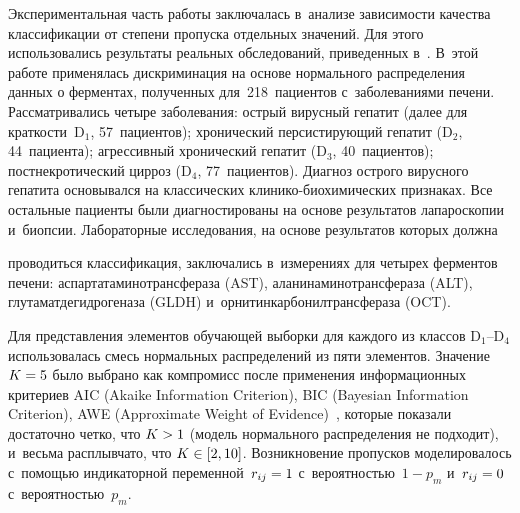 \begin{multicols}{2}
     Экспериментальная часть работы заключалась в~анализе зависимости 
качества классификации от степени пропуска отдельных значений. Для этого 
использовались результаты реальных обследований, приведенных 
в~\cite[разд.~5]{12-kri}. В~этой работе применялась дискриминация на основе 
нормального распределения данных о ферментах, полученных 
для~218~пациентов с~заболеваниями печени. Рассматривались четыре 
заболевания: острый вирусный гепатит (далее для краткости~D$_1$, 
57~пациентов); хронический персистирующий гепатит (D$_2$, 44~пациента); 
агрессивный хронический гепатит (D$_3$, 40~пациентов); постнекротический 
цирроз (D$_4$, 77~пациентов). Диагноз острого вирусного гепатита 
основывался на классических кли\-ни\-ко-био\-хи\-ми\-че\-ских признаках. Все 
остальные пациенты были диагностированы на основе результатов 
лапароскопии и~биопсии. Лабораторные исследования, на основе результатов 
которых должна\linebreak\vspace*{-12pt}

\pagebreak

\noindent
 проводиться классификация, заключались в~измерениях для 
четырех ферментов печени: аспартатаминотрансфераза (AST), 
аланинаминотрансфераза (ALT), глутаматдегидрогеназа (GLDH) 
и~орнитинкарбонилтрансфераза (OCT). 
     
     Для представления элементов обучающей выборки для каждого из 
классов D$_1$--D$_4$ использовалась смесь нормальных распределений из пяти 
элементов. Значение $K\hm=5$ было выбрано как компромисс после 
применения информационных критериев AIC (Akaike Information Criterion), 
BIC (Bayesian Information Criterion),  
AWE (Approximate Weight of Evidence)~\cite[разд.~2.3.3]{13-kri}, 
которые показали достаточно четко, что $K\hm>1$
  (модель нормального распределения не подходит), и~весьма расплывчато, что 
     $K\hm\in [2,10]$. Возникновение пропусков моделировалось с~по\-мощью 
индикаторной переменной~$r_{ij}\hm=1$ с~вероятностью~$1-p_m$ 
и~$r_{ij}\hm=0$ с~вероятностью~$p_m$.
     

\end{multicols}
